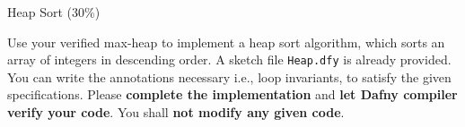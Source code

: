 \documentclass[11pt,a4paper]{article}
\let\t\texttt
\begin{document}
\newpage
\begin{problem}{Heap Sort (30\%)}

Use your verified max-heap to implement a heap sort algorithm, 
which sorts an array of integers in descending order.
A sketch file \t{Heap.dfy} is already provided.
You can write the annotations necessary
i.e., loop invariants, 
to satisfy the given specifications.
Please \textbf{complete the implementation} and 
\textbf{let Dafny compiler verify your code}.
You shall \textbf{not modify any given code}.

\end{problem}
\end{document}
